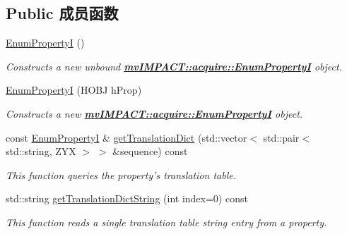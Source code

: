 \subsection*{Public 成员函数}
\begin{DoxyCompactItemize}
\item 
\hypertarget{classmv_i_m_p_a_c_t_1_1acquire_1_1_enum_property_i_a4a842d2d46b35f1682f1355b24d4edeb}{\hyperlink{classmv_i_m_p_a_c_t_1_1acquire_1_1_enum_property_i_a4a842d2d46b35f1682f1355b24d4edeb}{Enum\+Property\+I} ()}\label{classmv_i_m_p_a_c_t_1_1acquire_1_1_enum_property_i_a4a842d2d46b35f1682f1355b24d4edeb}

\begin{DoxyCompactList}\small\item\em Constructs a new unbound {\bfseries \hyperlink{classmv_i_m_p_a_c_t_1_1acquire_1_1_enum_property_i}{mv\+I\+M\+P\+A\+C\+T\+::acquire\+::\+Enum\+Property\+I}} object. \end{DoxyCompactList}\item 
\hyperlink{classmv_i_m_p_a_c_t_1_1acquire_1_1_enum_property_i_a94f5d0845dcdcda138535a6a291d8529}{Enum\+Property\+I} (H\+O\+B\+J h\+Prop)
\begin{DoxyCompactList}\small\item\em Constructs a new {\bfseries \hyperlink{classmv_i_m_p_a_c_t_1_1acquire_1_1_enum_property_i}{mv\+I\+M\+P\+A\+C\+T\+::acquire\+::\+Enum\+Property\+I}} object. \end{DoxyCompactList}\item 
const \hyperlink{classmv_i_m_p_a_c_t_1_1acquire_1_1_enum_property_i}{Enum\+Property\+I} \& \hyperlink{classmv_i_m_p_a_c_t_1_1acquire_1_1_enum_property_i_a92e3a5ab99d1d15fb3152d5909a44d8f}{get\+Translation\+Dict} (std\+::vector$<$ std\+::pair$<$ std\+::string, Z\+Y\+X $>$ $>$ \&sequence) const 
\begin{DoxyCompactList}\small\item\em This function queries the property's translation table. \end{DoxyCompactList}\item 
std\+::string \hyperlink{classmv_i_m_p_a_c_t_1_1acquire_1_1_enum_property_i_af5ec5a9c3657af2917f4ead78ef067db}{get\+Translation\+Dict\+String} (int index=0) const 
\begin{DoxyCompactList}\small\item\em This function reads a single translation table string entry from a property. \end{DoxyCompactList}\item 

\end{DoxyCompactItemize}
